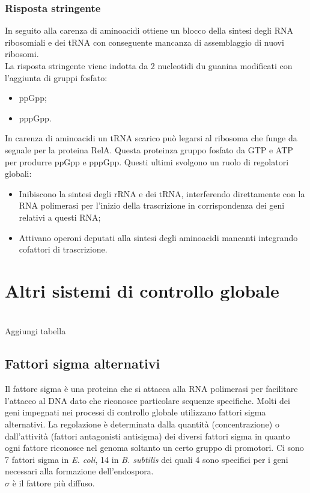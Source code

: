\subsubsection{Risposta stringente}
In seguito alla carenza di aminoacidi ottiene un blocco della sintesi degli RNA ribosomiali e dei tRNA con conseguente mancanza di assemblaggio di nuovi ribosomi. 
\\La risposta stringente viene indotta da 2 nucleotidi du guanina modificati con l'aggiunta di gruppi fosfato: 
\begin{itemize}
    \item ppGpp; 
    \item pppGpp.
\end{itemize}
In carenza di aminoacidi un tRNA scarico può legarsi al ribosoma che funge da segnale per la proteina RelA. Questa proteinza gruppo fosfato da GTP e ATP per produrre ppGpp e pppGpp. Questi ultimi svolgono un ruolo di regolatori globali: 
\begin{itemize}
    \item Inibiscono la sintesi degli rRNA e dei tRNA, interferendo direttamente con la RNA polimerasi per l'inizio della trascrizione in corrispondenza dei geni relativi a questi RNA;
    \item Attivano operoni deputati alla sintesi degli aminoacidi mancanti integrando cofattori di trascrizione. 
\end{itemize}
\section{Altri sistemi di controllo globale}
\\Aggiungi tabella
\subsection{Fattori sigma alternativi}
Il fattore sigma è una proteina che si attacca alla RNA polimerasi per facilitare l'attacco al DNA dato che riconosce particolare sequenze specifiche. Molti dei geni impegnati nei processi di controllo globale utilizzano fattori sigma alternativi. La regolazione è determinata dalla quantità (concentrazione) o dall'attività (fattori antagonisti antisigma) dei diversi fattori sigma in quanto ogni fattore riconosce nel genoma soltanto un certo gruppo di promotori. Ci sono 7 fattori sigma in \textit{E. coli}, 14 in \textit{B. subtilis} dei quali 4 sono specifici per i geni necessari alla formazione dell'endospora. 
\\$\sigma$ è  il fattore più diffuso. 
